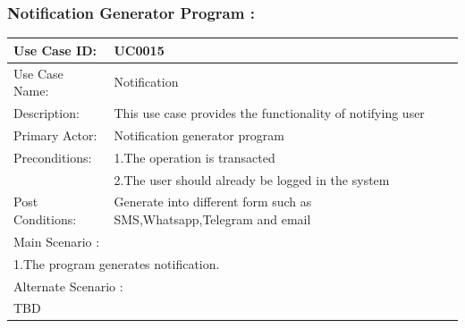 \subsubsection{Notification Generator Program :}
\begin{center}
\vspace*{1\baselineskip}	
\begin{tabular}{|l|p{10cm}|}
	\hline
	Use Case ID: & UC0015 \\
	\hline
	Use Case Name: & Notification \\
	\hline
	Description: & This use case provides the functionality of notifying user\\
	\hline
	Primary Actor: & Notification generator program \\
	\hline
	Preconditions: & 1.The operation is transacted\\ 
	& 2.The user should already be logged in the system \\
	\hline
	Post Conditions: & Generate into different form such as SMS,Whatsapp,Telegram and email\\
	\hline
	\multicolumn{2}{|l|}{Main Scenario :} \\
	\hline
	\multicolumn{2}{|l|}{1.The program generates notification.} \\
	\hline
	\multicolumn{2}{|l|}{Alternate Scenario :} \\
	\hline
	\multicolumn{2}{|l|}{TBD} \\
	\hline
\end{tabular}
\end{center}









